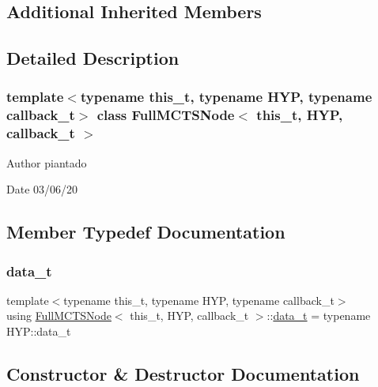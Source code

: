 \subsection*{Additional Inherited Members}


\subsection{Detailed Description}
\subsubsection*{template$<$typename this\+\_\+t, typename H\+YP, typename callback\+\_\+t$>$\newline
class Full\+M\+C\+T\+S\+Node$<$ this\+\_\+t, H\+Y\+P, callback\+\_\+t $>$}

\begin{DoxyAuthor}{Author}
piantado 
\end{DoxyAuthor}
\begin{DoxyDate}{Date}
03/06/20 
\end{DoxyDate}


\subsection{Member Typedef Documentation}
\mbox{\label{class_full_m_c_t_s_node_aeb23fb7cb05ca5e9af33a43054f79574}} 
\subsubsection{\texorpdfstring{data\+\_\+t}{data\_t}}
{\footnotesize\ttfamily template$<$typename this\+\_\+t, typename H\+YP, typename callback\+\_\+t$>$ \\
using \hyperlink{class_full_m_c_t_s_node}{Full\+M\+C\+T\+S\+Node}$<$ this\+\_\+t, H\+YP, callback\+\_\+t $>$\+::\hyperlink{class_full_m_c_t_s_node_aeb23fb7cb05ca5e9af33a43054f79574}{data\+\_\+t} =  typename H\+Y\+P\+::data\+\_\+t}



\subsection{Constructor \& Destructor Documentation}
\mbox{\label{class_full_m_c_t_s_node_a9604af49d0770347774d05307c744c70}} 
